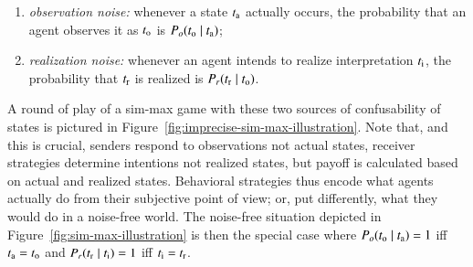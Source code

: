 \documentclass[fleqn,reqno,10pt]{article}
\begin{document}
\begin{enumerate}
\item \emph{observation noise:} whenever a state $t_{\mathrm{a}}$ actually occurs, the probability
  that an agent observes it as $t_{\mathrm{o}}$ is $P_o(t_{\mathrm{o}} \mid t_{\mathrm{a}})$;
\item \emph{realization noise:} whenever an agent intends to realize interpretation
  $t_{\mathrm{i}}$, the probability that $t_{\mathrm{r}}$ is realized is
  $P_r(t_{\mathrm{r}} \mid t_{\mathrm{o}})$.
\end{enumerate}

\noindent A round of play of a sim-max game with these two sources of confusability of states
is pictured in Figure~\ref{fig:imprecise-sim-max-illustration}. Note that, and this is crucial,
senders respond to observations not actual states, receiver strategies determine intentions not
realized states, but payoff is calculated based on actual and realized states. Behavioral
strategies thus encode what agents actually do from their subjective point of view; or, put
differently, what they would do in a noise-free world. The noise-free situation depicted in
Figure~\ref{fig:sim-max-illustration} is then the special case where
$P_o(t_{\mathrm{o}} \mid t_{\mathrm{a}}) = 1$ iff $t_{\mathrm{a}} = t_{\mathrm{o}}$ and
$P_r(t_{\mathrm{r}} \mid t_{\mathrm{i}}) = 1$ iff $t_{\mathrm{i}} = t_{\mathrm{r}}$.
\end{document}
